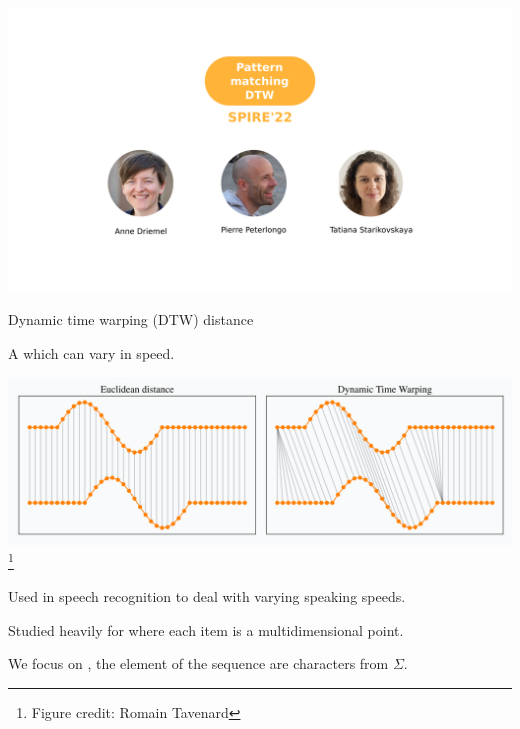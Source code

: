 
\newcommand{\dtw}{\mathrm{DTW}}
\newcommand{\ed}{\mathrm{ED}}
\newcommand{\RLE}{\mathrm{RLE}}

\begin{frame}
    \includegraphics[width=\textwidth]{pictures/mindmap/dtw.png}
\end{frame}


\begin{frame}{Dynamic time warping (DTW) distance }

A  which can vary in speed.

\begin{center}
\includegraphics[scale=0.3]{figures/dtw_vs_euc.png}\footnote{Figure credit: Romain Tavenard}
\end{center}
\pause
Used in speech recognition to deal with varying speaking speeds.\pause

Studied heavily for  where each item is a multidimensional point.

We focus on , the element of the sequence are characters from $\Sigma$.

\end{frame}

